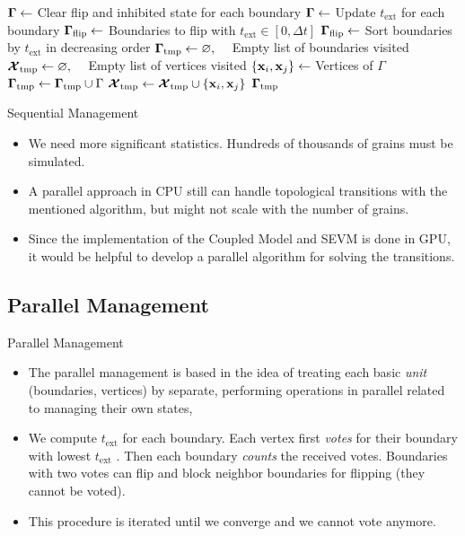 \documentclass[usenames,dvipsnames]{beamer}
\begin{document}
\begin{frame}
\begin{algorithmic}[1]
\State $\bm{\Gamma} \gets$ Clear flip and inhibited state for each boundary
\State $\bm{\Gamma} \gets$ Update $t_{\text{ext}}$ for each boundary
\State $\bm{\Gamma}_{\text{flip}} \gets$ Boundaries to flip with $t_{\text{ext}} \in [0, \Delta t]$ 
\State $\bm{\Gamma}_{\text{flip}} \gets$ Sort boundaries by $t_{\text{ext}}$ in decreasing order
\State $\bm{\Gamma}_{\text{tmp}} \gets \varnothing,\quad$ Empty list of boundaries visited
\State $\bm{\mathcal{X}}_{\text{tmp}} \gets \varnothing,\quad$ Empty list of vertices visited
    \State $\{\x_i, \x_j\} \gets $ Vertices of $\Gamma$
        \State $\bm{\Gamma}_{\text{tmp}} \gets \bm{\Gamma}_{\text{tmp}} \cup \Gamma$
        \State $\vertices_{\text{tmp}} \gets \vertices_{\text{tmp}} \cup \{\x_i, \x_j\}$
    \Else
        \State \Return $\bm{\Gamma}_{\text{tmp}}$
    \EndIf
\EndFor
\EndProcedure
\end{algorithmic}
\end{frame}

\begin{frame}{Sequential Management}
\begin{itemize}
    \item We need more significant statistics. Hundreds of thousands of grains must be simulated.
    \item A parallel approach in CPU still can handle topological transitions with the mentioned algorithm, but might not scale with the number of grains.
    \item Since the implementation of the Coupled Model and SEVM  is done in GPU, it would be helpful to develop a parallel algorithm for solving the transitions.
\end{itemize}
\end{frame}

\subsection{Parallel Management}
\begin{frame}{Parallel Management}
\begin{itemize}
    \item The parallel management is based in the idea of treating each basic \emph{unit}  (boundaries, vertices) by separate, performing operations in parallel related to managing their own states,
    \item We compute $t_\text{ext}$ for each boundary. Each vertex first \emph{votes} for their boundary with lowest $t_\text{ext}$ . Then each boundary \emph{counts} the received votes. Boundaries with two votes can flip and block neighbor boundaries for flipping (\ie they cannot be voted).
    \item This procedure is iterated until we converge and we cannot vote anymore.
\end{itemize}
\end{frame}
\end{document}
